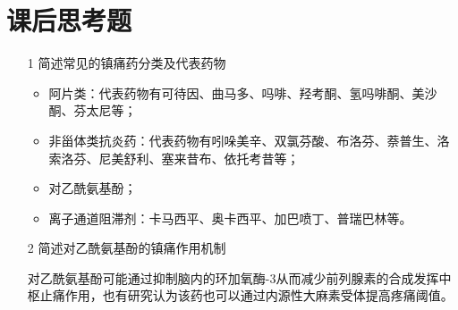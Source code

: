 \documentclass[UTF8]{ctexart}
\begin{document}
\section{课后思考题}

\begin{itemize}
    \item [1] 简述常见的镇痛药分类及代表药物
    
        \begin{itemize}
            \item 阿片类：代表药物有可待因、曲马多、吗啡、羟考酮、氢吗啡酮、美沙酮、芬太尼等；
            \item 非甾体类抗炎药：代表药物有吲哚美辛、双氯芬酸、布洛芬、萘普生、洛索洛芬、尼美舒利、塞来昔布、依托考昔等；
            \item 对乙酰氨基酚；
            \item 离子通道阻滞剂：卡马西平、奥卡西平、加巴喷丁、普瑞巴林等。
        \end{itemize}

    \item [2] 简述对乙酰氨基酚的镇痛作用机制
    
        对乙酰氨基酚可能通过抑制脑内的环加氧酶-3从而减少前列腺素的合成发挥中枢止痛作用，也有研究认为该药也可以通过内源性大麻素受体提高疼痛阈值。
\end{itemize}


\end{document}
